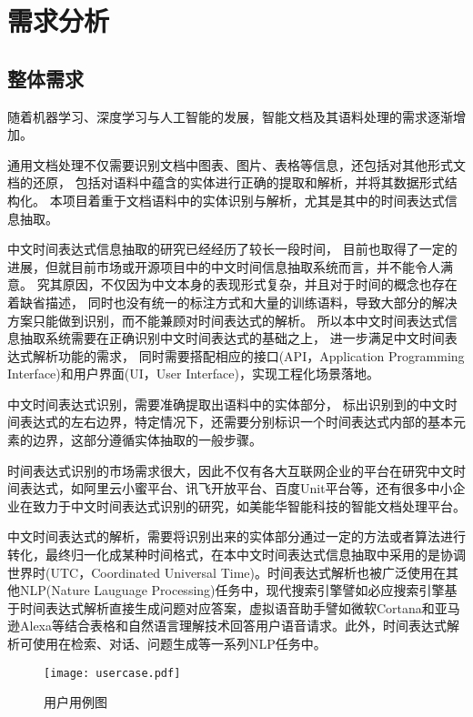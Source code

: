 
\chapter{需求分析}

\section{整体需求}

随着机器学习、深度学习与人工智能的发展，智能文档及其语料处理的需求逐渐增加。

通用文档处理不仅需要识别文档中图表、图片、表格等信息，还包括对其他形式文档的还原，
包括对语料中蕴含的实体进行正确的提取和解析，并将其数据形式结构化。
本项目着重于文档语料中的实体识别与解析，尤其是其中的时间表达式信息抽取。

中文时间表达式信息抽取的研究已经经历了较长一段时间，
目前也取得了一定的进展，但就目前市场或开源项目中的中文时间信息抽取系统而言，并不能令人满意。
究其原因，不仅因为中文本身的表现形式复杂，并且对于时间的概念也存在着缺省描述，
同时也没有统一的标注方式和大量的训练语料，导致大部分的解决方案只能做到识别，而不能兼顾对时间表达式的解析。
所以本中文时间表达式信息抽取系统需要在正确识别中文时间表达式的基础之上，
进一步满足中文时间表达式解析功能的需求，
同时需要搭配相应的接口(API，Application Programming Interface)和用户界面(UI，User Interface)，实现工程化场景落地。

中文时间表达式识别，需要准确提取出语料中的实体部分，
标出识别到的中文时间表达式的左右边界，特定情况下，还需要分别标识一个时间表达式内部的基本元素的边界，这部分遵循实体抽取的一般步骤。

时间表达式识别的市场需求很大，因此不仅有各大互联网企业的平台在研究中文时间表达式，如阿里云小蜜平台、讯飞开放平台、百度Unit平台等，还有很多中小企业在致力于中文时间表达式识别的研究，如美能华智能科技的智能文档处理平台。

中文时间表达式的解析，需要将识别出来的实体部分通过一定的方法或者算法进行转化，最终归一化成某种时间格式，在本中文时间表达式信息抽取中采用的是协调世界时(UTC，Coordinated Universal Time)。时间表达式解析也被广泛使用在其他NLP(Nature Lauguage Processing)任务中，现代搜索引擎譬如必应搜索引擎基于时间表达式解析直接生成问题对应答案，虚拟语音助手譬如微软Cortana和亚马逊Alexa等结合表格和自然语言理解技术回答用户语音请求。此外，时间表达式解析可使用在检索、对话、问题生成等一系列NLP任务中。

\begin{figure}[h]
    \centering
    \texttt{[image: usercase.pdf]}
    \caption{用户用例图}
    \label{fig:usecase}
\end{figure}


